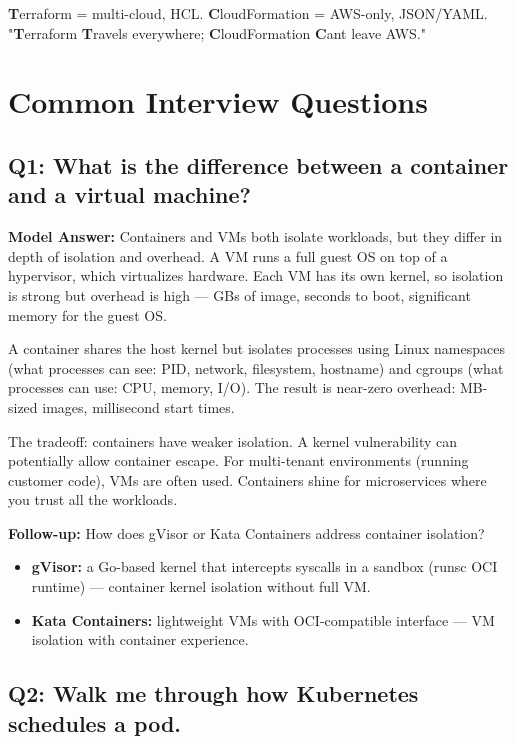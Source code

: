 \documentclass[11pt]{article}
\providecommand{\tightlist}{\setlength{\itemsep}{1pt}\setlength{\parskip}{0pt}}
\begin{document}
\textbf{T}erraform = multi-cloud, HCL. \textbf{C}loudFormation = AWS-only, JSON/YAML.
"\textbf{T}erraform \textbf{T}ravels everywhere; \textbf{C}loudFormation \textbf{C}an\textquotesingle t leave AWS."

\section{Common Interview Questions}\label{common-interview-questions}

\subsection{Q1: What is the difference between a container and a virtual machine?}\label{q1-what-is-the-difference-between-a-container-and-a-virtual-machine}

\textbf{Model Answer:}
Containers and VMs both isolate workloads, but they differ in depth of isolation and overhead. A VM runs a full guest OS on top of a hypervisor, which virtualizes hardware. Each VM has its own kernel, so isolation is strong but overhead is high --- GBs of image, seconds to boot, significant memory for the guest OS.

A container shares the host kernel but isolates processes using Linux namespaces (what processes can see: PID, network, filesystem, hostname) and cgroups (what processes can use: CPU, memory, I/O). The result is near-zero overhead: MB-sized images, millisecond start times.

The tradeoff: containers have weaker isolation. A kernel vulnerability can potentially allow container escape. For multi-tenant environments (running customer code), VMs are often used. Containers shine for microservices where you trust all the workloads.

\textbf{Follow-up:} How does gVisor or Kata Containers address container isolation?

\begin{itemize}
\tightlist
\item
  \textbf{gVisor:} a Go-based kernel that intercepts syscalls in a sandbox (runsc OCI runtime) --- container kernel isolation without full VM.
\item
  \textbf{Kata Containers:} lightweight VMs with OCI-compatible interface --- VM isolation with container experience.
\end{itemize}

\subsection{Q2: Walk me through how Kubernetes schedules a pod.}\label{q2-walk-me-through-how-kubernetes-schedules-a-pod}
\end{document}

